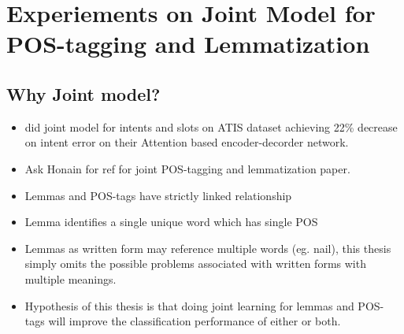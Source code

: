 \documentclass[12pt,a4paper,english
]{tutthesis}
\begin{document}
\chapter{Experiements on Joint Model for POS-tagging and Lemmatization}
\label{ch:experiements_on_joint_model_for_pos_tagging_and_lemmatization}

\section{Why Joint model?}
\begin{itemize}
\item \cite{Liu2016a} did joint model for intents and slots on ATIS dataset achieving 22\% decrease on intent error on their Attention based encoder-decorder network.
\item Ask Honain for ref for joint POS-tagging and lemmatization paper.
\item Lemmas and POS-tags have strictly linked relationship
\item Lemma identifies a single unique word which has single POS
\item Lemmas as written form may reference multiple words (eg. nail), this thesis simply omits the possible problems associated with written forms with multiple meanings.
\item Hypothesis of this thesis is that doing joint learning for lemmas and POS-tags will improve the classification performance of either or both.
\end{itemize}
\end{document}
